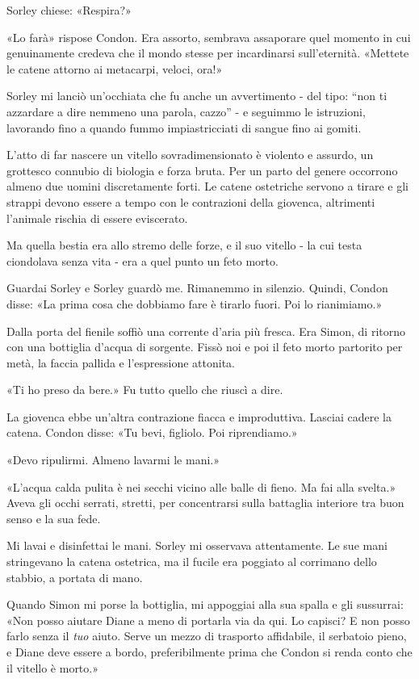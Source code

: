 Sorley chiese: «Respira?»

«Lo farà» rispose Condon. Era assorto, sembrava assaporare quel momento
in cui genuinamente credeva che il mondo stesse per incardinarsi
sull'eternità. «Mettete le catene attorno ai metacarpi, veloci, ora!»

Sorley mi lanciò un'occhiata che fu anche un avvertimento - del tipo:
``non ti azzardare a dire nemmeno una parola, cazzo'' - e seguimmo le
istruzioni, lavorando fino a quando fummo impiastricciati di sangue fino
ai gomiti.

L'atto di far nascere un vitello sovradimensionato è violento e assurdo,
un grottesco connubio di biologia e forza bruta. Per un parto del genere
occorrono almeno due uomini discretamente forti. Le catene ostetriche
servono a tirare e gli strappi devono essere a tempo con le contrazioni
della giovenca, altrimenti l'animale rischia di essere eviscerato.

Ma quella bestia era allo stremo delle forze, e il suo vitello - la cui
testa ciondolava senza vita - era a quel punto un feto morto.

Guardai Sorley e Sorley guardò me. Rimanemmo in silenzio. Quindi, Condon
disse: «La prima cosa che dobbiamo fare è tirarlo fuori. Poi lo
rianimiamo.»

Dalla porta del fienile soffiò una corrente d'aria più fresca. Era
Simon, di ritorno con una bottiglia d'acqua di sorgente. Fissò noi e poi
il feto morto partorito per metà, la faccia pallida e l'espressione
attonita.

«Ti ho preso da bere.» Fu tutto quello che riuscì a dire.

La giovenca ebbe un'altra contrazione fiacca e improduttiva. Lasciai
cadere la catena. Condon disse: «Tu bevi, figliolo. Poi riprendiamo.»

«Devo ripulirmi. Almeno lavarmi le mani.»

«L'acqua calda pulita è nei secchi vicino alle balle di fieno. Ma fai
alla svelta.» Aveva gli occhi serrati, stretti, per concentrarsi sulla
battaglia interiore tra buon senso e la sua fede.

Mi lavai e disinfettai le mani. Sorley mi osservava attentamente. Le sue
mani stringevano la catena ostetrica, ma il fucile era poggiato al
corrimano dello stabbio, a portata di mano.

Quando Simon mi porse la bottiglia, mi appoggiai alla sua spalla e gli
sussurrai: «Non posso aiutare Diane a meno di portarla via da qui. Lo
capisci? E non posso farlo senza il \emph{tuo} aiuto. Serve un mezzo di
trasporto affidabile, il serbatoio pieno, e Diane deve essere a bordo,
preferibilmente prima che Condon si renda conto che il vitello è morto.»

